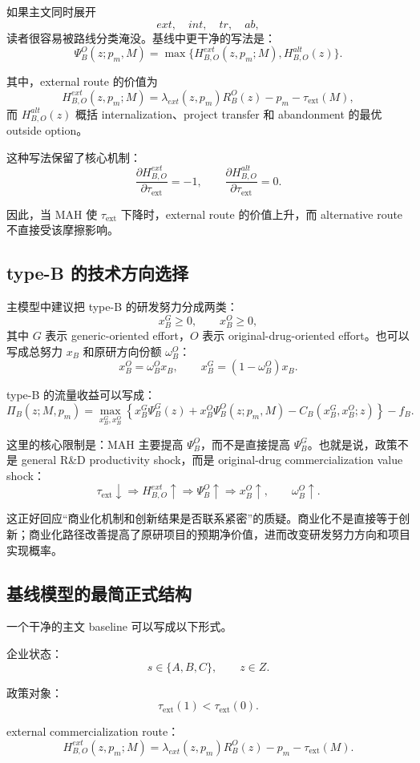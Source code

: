 \documentclass[12pt]{article}
\newcommand{\tauext}{\tau_{\mathrm{ext}}}
\begin{document}
如果主文同时展开
\[
ext,\quad int,\quad tr,\quad ab,
\]
读者很容易被路线分类淹没。基线中更干净的写法是：
\[
\Psi_B^O(z;p_m,M)=\max\{H_{B,O}^{ext}(z,p_m;M),H_{B,O}^{alt}(z)\}.
\]

其中，external route 的价值为
\[
H_{B,O}^{ext}(z,p_m;M)=\lambda_{ext}(z,p_m)R_B^O(z)-p_m-\tauext(M),
\]
而 $H_{B,O}^{alt}(z)$ 概括 internalization、project transfer 和 abandonment 的最优 outside option。

这种写法保留了核心机制：
\[
\frac{\partial H_{B,O}^{ext}}{\partial \tauext}=-1,
\qquad
\frac{\partial H_{B,O}^{alt}}{\partial \tauext}=0.
\]

因此，当 MAH 使 $\tauext$ 下降时，external route 的价值上升，而 alternative route 不直接受该摩擦影响。

\subsection{type-B 的技术方向选择}

主模型中建议把 type-B 的研发努力分成两类：
\[
x_B^G \ge 0,\qquad x_B^O \ge 0,
\]
其中 $G$ 表示 generic-oriented effort，$O$ 表示 original-drug-oriented effort。也可以写成总努力 $x_B$ 和原研方向份额 $\omega_B^O$：
\[
x_B^O=\omega_B^O x_B,\qquad x_B^G=(1-\omega_B^O)x_B.
\]

type-B 的流量收益可以写成：
\[
\Pi_B(z;M,p_m)
=
\max_{x_B^G,x_B^O}\left\{
 x_B^G\Psi_B^G(z)
+x_B^O\Psi_B^O(z;p_m,M)
-C_B(x_B^G,x_B^O;z)
\right\}-f_B.
\]

这里的核心限制是：MAH 主要提高 $\Psi_B^O$，而不是直接提高 $\Psi_B^G$。也就是说，政策不是 general R\&D productivity shock，而是 original-drug commercialization value shock：
\[
\tauext\downarrow
\Rightarrow H_{B,O}^{ext}\uparrow
\Rightarrow \Psi_B^O\uparrow
\Rightarrow x_B^O\uparrow,
\qquad
\omega_B^O\uparrow.
\]

这正好回应“商业化机制和创新结果是否联系紧密”的质疑。商业化不是直接等于创新；商业化路径改善提高了原研项目的预期净价值，进而改变研发努力方向和项目实现概率。

\subsection{基线模型的最简正式结构}

一个干净的主文 baseline 可以写成以下形式。

企业状态：
\[
s\in\{A,B,C\},\qquad z\in Z.
\]

政策对象：
\[
\tauext(1)<\tauext(0).
\]

external commercialization route：
\[
H_{B,O}^{ext}(z,p_m;M)
=
\lambda_{ext}(z,p_m)R_B^O(z)-p_m-\tauext(M).
\]
\end{document}
